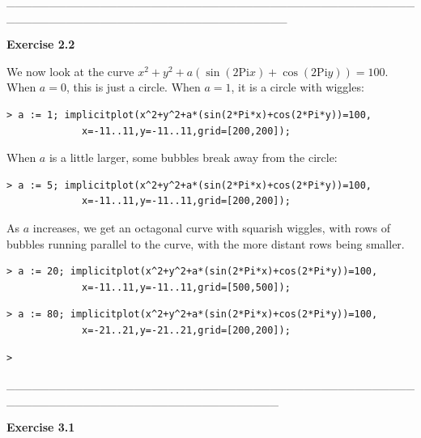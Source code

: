 \documentclass{article}
\begin{document}
\begin{Maple Normal}
\_\_\_\_\_\_\_\_\_\_\_\_\_\_\_\_\_\_\_\_\_\_\_\_\_\_\_\_\_\_\_\_\_\_\_\_\_\_\_\_\_\_\_\_\_\_\_\_\_\_\_\_\_\_\_\_\_\_\_\_\_\_\_\_\_\_\_\_\_\_\_\_\_\_\_\_\_\_\_\_\_
\end{Maple Normal}
\begin{Maple Normal}
\textbf{Exercise 2.2}
\end{Maple Normal}
\begin{Maple Normal}
We now look at the curve 
$ x^{2}+y^{2}+a (\sin (2 \mathrm{Pi} x)+\cos (2 \mathrm{Pi} y))=100 $.  When 
$ a =0 $, this is just a circle.  When 
$ a =1 $, it is a circle with wiggles:
\end{Maple Normal}
\begin{lstlisting}
> a := 1; implicitplot(x^2+y^2+a*(sin(2*Pi*x)+cos(2*Pi*y))=100,
             x=-11..11,y=-11..11,grid=[200,200]);
\end{lstlisting}
\begin{Maple Normal}
When 
$ a  $ is a little larger, some bubbles break away from the circle:
\end{Maple Normal}
\begin{lstlisting}
> a := 5; implicitplot(x^2+y^2+a*(sin(2*Pi*x)+cos(2*Pi*y))=100,
             x=-11..11,y=-11..11,grid=[200,200]);
\end{lstlisting}
\begin{Maple Normal}
As 
$ a  $ increases, we get an octagonal curve with squarish wiggles, with rows of bubbles running parallel to the curve, with the more distant rows being smaller.
\end{Maple Normal}
\begin{lstlisting}
> a := 20; implicitplot(x^2+y^2+a*(sin(2*Pi*x)+cos(2*Pi*y))=100,
             x=-11..11,y=-11..11,grid=[500,500]);
\end{lstlisting}
\begin{lstlisting}
> a := 80; implicitplot(x^2+y^2+a*(sin(2*Pi*x)+cos(2*Pi*y))=100,
             x=-21..21,y=-21..21,grid=[200,200]);
\end{lstlisting}
\begin{lstlisting}
> 
\end{lstlisting}
\begin{Maple Normal}
\_\_\_\_\_\_\_\_\_\_\_\_\_\_\_\_\_\_\_\_\_\_\_\_\_\_\_\_\_\_\_\_\_\_\_\_\_\_\_\_\_\_\_\_\_\_\_\_\_\_\_\_\_\_\_\_\_\_\_\_\_\_\_\_\_\_\_\_\_\_\_\_\_\_\_\_\_\_\_\_
\end{Maple Normal}
\begin{Maple Normal}
\textbf{Exercise 3.1}
\end{Maple Normal}
\end{document}
